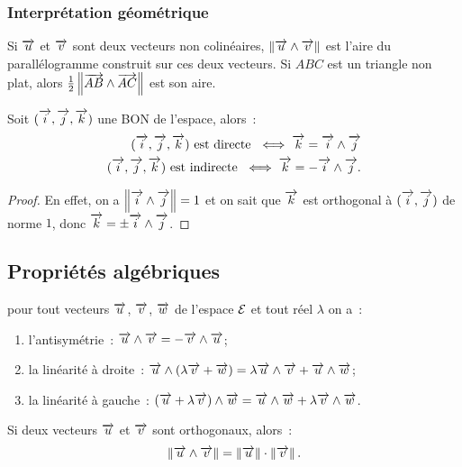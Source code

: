 \subsubsection{Interprétation géométrique}

Si \(\vu\) et \(\vv\) sont deux vecteurs non colinéaires,
\(\norme{\vu\wedge\vv}\) est l'aire du parallélogramme construit sur ces deux
vecteurs. Si \(ABC\) est un triangle non plat, alors
\(\frac{1}{2}\norme{\vect{AB}\wedge\vect{AC}}\) est son aire.
\begin{prop}
  Soit \(\bondtrois\) une BON de l'espace, alors~:
  \begin{align}
    \bondtrois\text{~est directe~}\iff \vk = \vi\wedge\vj\\
    \bondtrois\text{~est indirecte~}\iff \vk = -\vi\wedge\vj.
  \end{align}
\end{prop}

\begin{proof}
  En effet, on a \(\norme{\vi\wedge\vj} = 1\) et on sait que \(\vk\) est
  orthogonal à \((\vi, \vj)\) de norme \(1\), donc \(\vk = \pm\vi\wedge\vj\).
\end{proof}

\subsection{Propriétés algébriques}

\begin{prop}
  pour tout vecteurs \(\vu\), \(\vv\), \(\vw\) de l'espace \(\E\) et tout réel
  \(\lambda\) on a~:
  \begin{enumerate}
    \item l'antisymétrie~: \(\vu\wedge\vv = -\vv\wedge\vu\);
    \item la linéarité à droite~: \(\vu\wedge(\lambda\vv + \vw) =
      \lambda\vu\wedge\vv + \vu\wedge\vw\);
    \item la linéarité à gauche~: \((\vu + \lambda\vv)\wedge\vw = \vu\wedge\vw
      + \lambda\vv\wedge\vw\).
  \end{enumerate}
\end{prop}

\begin{prop}
  Si deux vecteurs \(\vu\) et \(\vv\) sont orthogonaux, alors~:
  \begin{equation}
    \norme{\vu\wedge\vv} = \norme{\vu}\cdot\norme{\vv}.
  \end{equation}
\end{prop}

